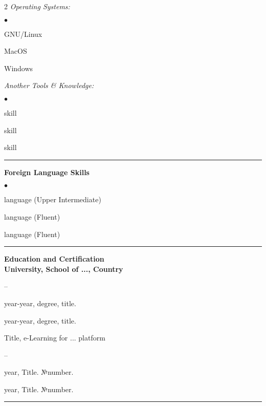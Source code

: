 \documentclass[oneside,final,10pt]{extreport}
\newenvironment{compactlist}{
	\begin{list}{{$\bullet$}}{
		\setlength\leftmargin{0.4cm}
		\setlength\partopsep{0pt}
		\setlength\parskip{0pt}
		\setlength\parsep{0pt}
		\setlength\topsep{0pt}
		\setlength\itemsep{0pt}
	}
}{
	\end{list}
}
\newenvironment{innerlist}{
	\begin{list}{--}{
		\setlength\leftmargin{0.8cm}
		\setlength\partopsep{0pt}
		\setlength\parskip{0pt}
		\setlength\parsep{0pt}
		\setlength\topsep{0pt}
		\setlength\itemsep{0pt}
	}
}{
	\end{list}
}
\begin{document}
\begin{multicols}{2}
\textsl{Operating Systems:}
	 \begin{compactlist}
		 \item GNU/Linux
		 \item MacOS
		 \item Windows
	 \end{compactlist}
\textsl{Another Tools \& Knowledge:}
	 \begin{compactlist}
		 \item skill
		 \item skill
		 \item skill
	 \end{compactlist}
\end{multicols}
\rule{\textwidth}{0.4pt}

\bfseries
Foreign Language Skills
\mdseries
\begin{compactlist}
	 \item language (Upper Intermediate)
	 \item language (Fluent)
	 \item language (Fluent) 
\end{compactlist}
\rule{\textwidth}{0.4pt}

\bfseries
Education and Certification
\mdseries \\[3pt]	
University, School of ..., Country  	
	 \begin{innerlist}	
	      \item year-year, degree, title. 
	      \item year-year, degree, title. 
	 \end{innerlist}	
Title, e-Learning for ... platform 
	 \begin{innerlist}	
	      \item year, Title. №number.
	      \item year, Title. №number.
	 \end{innerlist}	 
\rule{\textwidth}{0.4pt}
\end{document}
